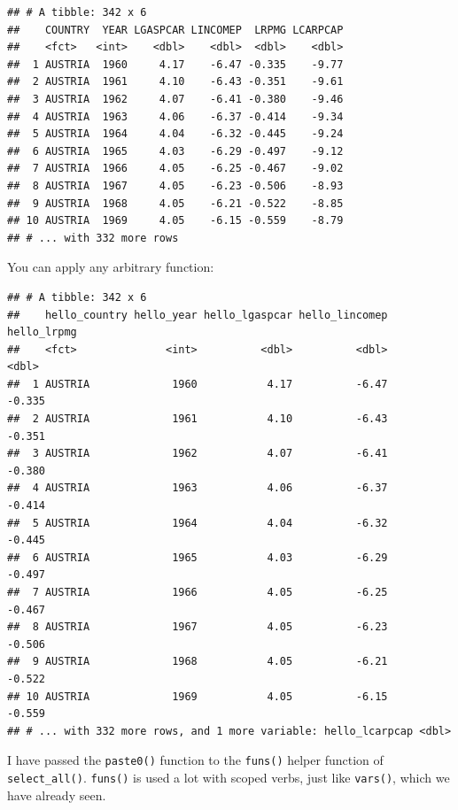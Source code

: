 \documentclass[]{gitbook}
\newenvironment{Shaded}{\begin{snugshade}}{\end{snugshade}}
\newcommand{\KeywordTok}[1]{\textcolor[rgb]{0.13,0.29,0.53}{\textbf{#1}}}
\newcommand{\NormalTok}[1]{#1}
\newcommand{\OperatorTok}[1]{\textcolor[rgb]{0.81,0.36,0.00}{\textbf{#1}}}
\newcommand{\StringTok}[1]{\textcolor[rgb]{0.31,0.60,0.02}{#1}}
\begin{document}
\begin{verbatim}
## # A tibble: 342 x 6
##    COUNTRY  YEAR LGASPCAR LINCOMEP  LRPMG LCARPCAP
##    <fct>   <int>    <dbl>    <dbl>  <dbl>    <dbl>
##  1 AUSTRIA  1960     4.17    -6.47 -0.335    -9.77
##  2 AUSTRIA  1961     4.10    -6.43 -0.351    -9.61
##  3 AUSTRIA  1962     4.07    -6.41 -0.380    -9.46
##  4 AUSTRIA  1963     4.06    -6.37 -0.414    -9.34
##  5 AUSTRIA  1964     4.04    -6.32 -0.445    -9.24
##  6 AUSTRIA  1965     4.03    -6.29 -0.497    -9.12
##  7 AUSTRIA  1966     4.05    -6.25 -0.467    -9.02
##  8 AUSTRIA  1967     4.05    -6.23 -0.506    -8.93
##  9 AUSTRIA  1968     4.05    -6.21 -0.522    -8.85
## 10 AUSTRIA  1969     4.05    -6.15 -0.559    -8.79
## # ... with 332 more rows
\end{verbatim}

You can apply any arbitrary function:

\begin{Shaded}
\end{Shaded}

\begin{verbatim}
## # A tibble: 342 x 6
##    hello_country hello_year hello_lgaspcar hello_lincomep hello_lrpmg
##    <fct>              <int>          <dbl>          <dbl>       <dbl>
##  1 AUSTRIA             1960           4.17          -6.47      -0.335
##  2 AUSTRIA             1961           4.10          -6.43      -0.351
##  3 AUSTRIA             1962           4.07          -6.41      -0.380
##  4 AUSTRIA             1963           4.06          -6.37      -0.414
##  5 AUSTRIA             1964           4.04          -6.32      -0.445
##  6 AUSTRIA             1965           4.03          -6.29      -0.497
##  7 AUSTRIA             1966           4.05          -6.25      -0.467
##  8 AUSTRIA             1967           4.05          -6.23      -0.506
##  9 AUSTRIA             1968           4.05          -6.21      -0.522
## 10 AUSTRIA             1969           4.05          -6.15      -0.559
## # ... with 332 more rows, and 1 more variable: hello_lcarpcap <dbl>
\end{verbatim}

I have passed the \texttt{paste0()} function to the \texttt{funs()} helper function of \texttt{select\_all()}. \texttt{funs()} is
used a lot with scoped verbs, just like \texttt{vars()}, which we have already seen.
\end{document}
